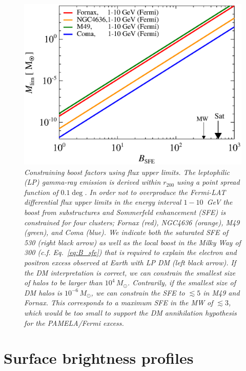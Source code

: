 \documentclass[10pt,aps,pra,reprint,amsmath,amsfonts,amssymb,showpacs,nofootinbib,floatfix]{revtex4-1}
\newcommand{\Fermi}{{\em Fermi}\xspace}
\newcommand{\msun}{M_\odot}
\newcommand{\rvir}{r_{200}}
\begin{document}
\begin{figure}%
 \includegraphics[width=0.99\columnwidth]{figures/LP.const.diff.v14.0.1deg.1.6T.SubMass.SF700.IR2.noMW.woGal.eps}
 \caption{\it Constraining boost factors using flux upper limits. The
   leptophilic (LP) gamma-ray emission is derived within $\rvir$ using
   a point spread function of $0.1\deg$. In order not to overproduce
   the \Fermi-LAT differential flux upper limits in the energy
   interval $1-10$~GeV the boost from substructures and Sommerfeld
   enhancement (SFE) is constrained for four clusters; Fornax (red),
   NGC4636 (orange), M49 (green), and Coma (blue). We indicate both
   the saturated SFE of 530 (right black arrow) as well as the local
   boost in the Milky Way of 300 (c.f. Eq.~\ref{eq:B_sfe}) that is
   required to explain the electron and positron excess observed at
   Earth with LP DM (left black arrow). If the DM interpretation is
   correct, we can constrain the smallest size of halos to be larger
   than $10^4\,\msun$. Contrarily, if the smallest size of DM halos is
   $10^{-6}\,\msun$, we can constrain the SFE to $\lesssim 5$ in M49 and
   Fornax. This corresponds to a maximum SFE in the MW of $\lesssim 3$,
   which would be too small to support the DM annihilation hypothesis
   for the PAMELA/\Fermi excess.}
 \label{fig:boost_const}
\end{figure}


\section{Surface brightness profiles}
\label{sect:spatial}
\end{document}
